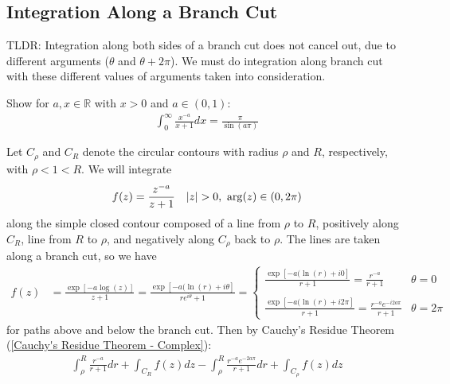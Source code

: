 \documentclass[12pt, english]{book}
\makeatletter
\renewenvironment{proof}[1][\proofname]{\par
	\pushQED{\qed}%
	\normalfont \topsep6\p@\@plus6\p@\relax
	\list{}{%
		\settowidth{\leftmargin}{\itshape\proofname:\hskip\labelsep}%
		\setlength{\labelwidth}{0pt}%
		\setlength{\itemindent}{-\leftmargin}%
		}%
	\item[\hskip\labelsep\itshape#1\@addpunct{:}]\ignorespaces
	}{\popQED\endlist\@endpefalse}
\makeatother
\begin{document}
	\subsection{Integration Along a Branch Cut} \label{Integration Along a Branch Cut Subsection - Complex}
	
	
	TLDR: Integration along both sides of a branch cut does not cancel out, due to different arguments (\(\theta\) and \(\theta + 2\pi\)). We must do integration along branch cut with these different values of arguments taken into consideration.
	
	\begin{example}
		\label{Integration along branch cut Example - Complex}
		Show for \(a, x \in \mathbb{R}\) with \(x > 0\) and \(a \in (0,1)\):
		\begin{align*}
			\int_{0}^{\infty} \frac{x^{-a}}{x+1} dx = \frac{\pi}{\sin(a\pi)}
		\end{align*}
		\begin{proof}
			Let \(C_\rho\) and \(C_R\) denote the circular contours with radius \(\rho\) and \(R\), respectively, with \(\rho < 1  < R\). We will integrate
			\begin{align*}
				f(z) &= \frac{z^{-a}}{z+1} & \abs{z}>0, \ \arg(z) \in (0, 2\pi)
			\end{align*}
			along the simple closed contour composed of a line from \(\rho\) to \(R\), positively along \(C_R\), line from \(R\) to \(\rho\), and negatively along \(C_\rho\) back to \(\rho\). The lines are taken along a branch cut, so we have 
			\begin{align*}
				f(z) 
				&= \frac{\exp[-a \log(z)]}{z+1} = \frac{\exp[-a (\ln(r) + i\theta]}{re^{i\theta} + 1} 
				= 
				\begin{cases} \displaystyle
					\frac{\exp[-a(\ln(r) + i0]}{r + 1} = \frac{r^{-a}}{r+1} & \theta = 0 \\ \\
					\displaystyle
					\frac{\exp[-a(\ln(r) + i2\pi]}{r + 1} = \frac{r^{-a}e^{-i2a\pi}}{r+1} & \theta = 2\pi
				\end{cases}
			\end{align*}
			for paths above and below the branch cut. Then by Cauchy's Residue Theorem (\cref{Cauchy's Residue Theorem - Complex}):
			\begin{align*}
				\int_{\rho}^{R} \frac{r^{-a}}{r+1} dr 
				+ \int_{C_R} f(z) dz 
				- \int_{\rho}^{R} \frac{r^{-a} e^{-2a\pi}}{r+1} dr
				+ \int_{C_\rho} f(z) dz 

\end{align*}
\end{proof}
\end{example}
\end{document}
